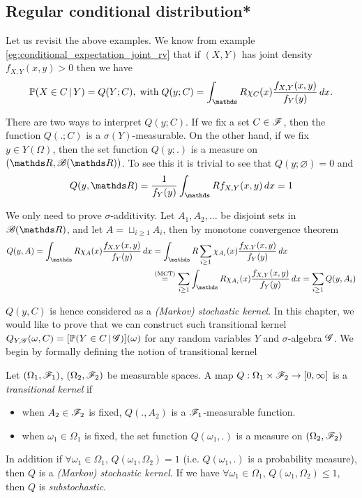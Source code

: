 \subsection{Regular conditional distribution*}
\begin{unexaminable}
Let us revisit the above examples. We know from example \ref{eg:conditional_expectation_joint_rv} that if $(X,Y)$ has joint density $f_{X,Y}(x,y) > 0$ then we have
\begin{equation}
    \p(X \in C \,|\, Y) = Q(Y;C), \; \text{with} \; Q(y;C) = \int_\R \chi_C(x) \frac{f_{X,Y}(x,y)}{f_Y(y)} \, dx.
\end{equation}

There are two ways to interpret $Q(y;C)$. If we fix a set $C \in \mathcal{F}$, then the function $Q(.;C)$ is a $\sigma(Y)$-measurable. On the other hand, if we fix $y \in Y(\Omega)$, then the set function $Q(y;.)$ is a measure on $(\R,\B(\R))$. To see this it is trivial to see that $Q(y;\varnothing) = 0$ and 
\begin{equation}
    Q(y,\R) = \frac{1}{f_Y(y)} \int_\R f_{X,Y}(x,y) \, dx = 1 
\end{equation}

We only need to prove $\sigma$-additivity. Let $A_1, A_2, ...$ be disjoint sets in $\B(\R)$, and let $A = \sqcup_{i\geq 1} A_i$, then by monotone convergence theorem
\begin{align*}
    Q(y,A) = \int_\R \chi_A(x) \frac{f_{X,Y}(x,y)}{f_Y(y)} \, dx 
    &= \int_\R \sum_{i\geq 1} \chi_{A_i}(x) \frac{f_{X,Y}(x,y)}{f_Y(y)} \, dx \\ &\overset{\text{(MCT)}}{=} \sum_{i\geq1} \int_\R \chi_{A_i}(x) \frac{f_{X,Y}(x,y)}{f_Y(y)} \, dx = \sum_{i\geq 1} Q(y,A_i)
\end{align*}

$Q(y,C)$ is hence considered as a \textit{(Markov) stochastic kernel}. In this chapter, we would like to prove that we can construct such transitional kernel $Q_{Y,\mathcal{G}}(\omega, C) = [\mathbb{P}(Y \in C \,|\, \mathcal{G})](\omega)$ for any random variables $Y$ and $\sigma$-algebra $\mathcal{G}$. We begin by formally defining the notion of transitional kernel

\begin{definition}
Let $(\Omega_1, \mathcal{F}_1)$, $(\Omega_2,\mathcal{F}_2)$ be measurable spaces. A map $Q:\Omega_1 \times \mathcal{F}_2 \to [0,\infty]$ is a \textit{transitional kernel} if
\begin{itemize}
    \item when $A_2 \in \mathcal{F}_2$ is fixed, $Q(.,A_2)$ is a $\mathcal{F}_1$-measurable function.
    \item when $\omega_1 \in \Omega_1$ is fixed, the set function $Q(\omega_1,.)$ is a measure on $(\Omega_2, \mathcal{F}_2)$
\end{itemize}
In addition if $\forall \omega_1 \in \Omega_1$, $Q(\omega_1, \Omega_2) = 1$ (i.e. $Q(\omega_1,.)$ is a probability measure), then $Q$ is a \textit{(Markov) stochastic kernel}. If we have $\forall \omega_1 \in \Omega_1$, $Q(\omega_1, \Omega_2) \leq 1$, then $Q$ is \textit{substochastic}.
\end{definition}


\end{unexaminable}
